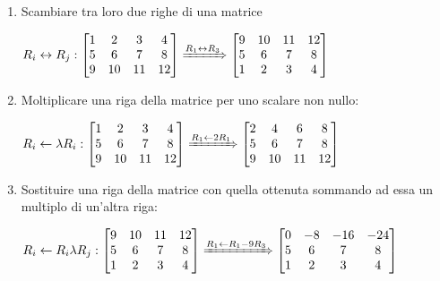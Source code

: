 \documentclass{article}
\begin{document}
\begin{enumerate}[label=\Roman*.]
	\item Scambiare tra loro due righe di una matrice

	      $R_i\leftrightarrow R_j:
		      \begin{bmatrix}
			      1 & 2  & 3  & 4  \\
			      5 & 6  & 7  & 8  \\
			      9 & 10 & 11 & 12
		      \end{bmatrix}\xRightarrow{R_1\leftrightarrow R_3}\begin{bmatrix}
			      9 & 10 & 11 & 12 \\
			      5 & 6  & 7  & 8  \\
			      1 & 2  & 3  & 4
		      \end{bmatrix}$

	\item Moltiplicare una riga della matrice per uno scalare non nullo:

	      $R_i\leftarrow\lambda R_i:
		      \begin{bmatrix}
			      1 & 2  & 3  & 4  \\
			      5 & 6  & 7  & 8  \\
			      9 & 10 & 11 & 12
		      \end{bmatrix}\xRightarrow{R_1\leftarrow2R_1}\begin{bmatrix}
			      2 & 4  & 6  & 8  \\
			      5 & 6  & 7  & 8  \\
			      9 & 10 & 11 & 12
		      \end{bmatrix}$


	\item Sostituire una riga della matrice con quella ottenuta sommando ad essa un multiplo di un'altra riga:

	      $R_i\leftarrow R_i\lambda R_j:
		      \begin{bmatrix}
			      9 & 10 & 11 & 12 \\
			      5 & 6  & 7  & 8  \\
			      1 & 2  & 3  & 4
		      \end{bmatrix}\xRightarrow{R_1\leftarrow R_1-9R_3}\begin{bmatrix}
			      0 & -8 & -16 & -24 \\
			      5 & 6  & 7   & 8   \\
			      1 & 2  & 3   & 4
		      \end{bmatrix}$
\end{enumerate}
\end{document}
